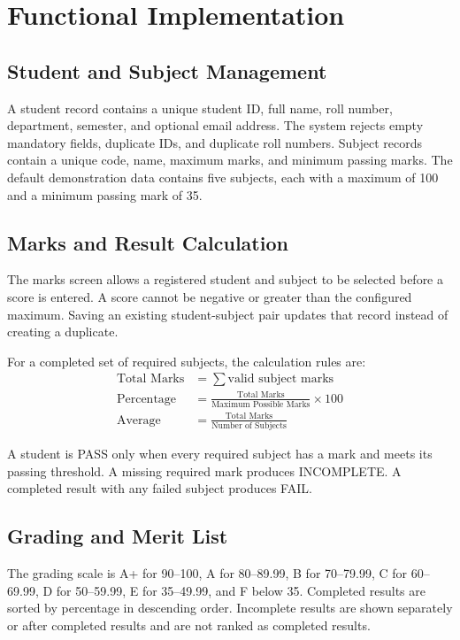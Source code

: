 \documentclass[11pt,a4paper]{report}
\begin{document}
\section{Functional Implementation}
\subsection{Student and Subject Management}
A student record contains a unique student ID, full name, roll number, department, semester, and optional email address. The system rejects empty mandatory fields, duplicate IDs, and duplicate roll numbers. Subject records contain a unique code, name, maximum marks, and minimum passing marks. The default demonstration data contains five subjects, each with a maximum of 100 and a minimum passing mark of 35.

\subsection{Marks and Result Calculation}
The marks screen allows a registered student and subject to be selected before a score is entered. A score cannot be negative or greater than the configured maximum. Saving an existing student-subject pair updates that record instead of creating a duplicate.

For a completed set of required subjects, the calculation rules are:
\begin{align*}
\text{Total Marks} &= \sum \text{valid subject marks}\\
\text{Percentage} &= \frac{\text{Total Marks}}{\text{Maximum Possible Marks}} \times 100\\
\text{Average} &= \frac{\text{Total Marks}}{\text{Number of Subjects}}
\end{align*}

A student is PASS only when every required subject has a mark and meets its passing threshold. A missing required mark produces INCOMPLETE. A completed result with any failed subject produces FAIL.

\subsection{Grading and Merit List}
The grading scale is A+ for 90--100, A for 80--89.99, B for 70--79.99, C for 60--69.99, D for 50--59.99, E for 35--49.99, and F below 35. Completed results are sorted by percentage in descending order. Incomplete results are shown separately or after completed results and are not ranked as completed results.
\end{document}
